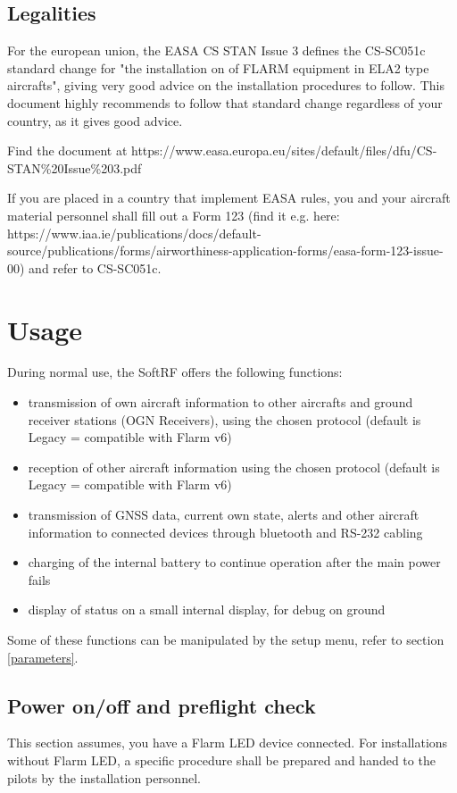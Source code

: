 \documentclass[10pt,a4paper]{article}
\begin{document}
\subsection{Legalities}
For the european union, the EASA CS STAN Issue 3 defines the CS-SC051c standard change for "the installation on of FLARM equipment in ELA2 type aircrafts", giving very good advice on the installation procedures to follow. This document highly recommends to follow that standard change regardless of your country, as it gives good advice.

Find the document at https://www.easa.europa.eu/sites/default/files/dfu/CS-STAN\%20Issue\%203.pdf

If you are placed in a country that implement EASA rules, you and your aircraft material personnel shall fill out a Form 123 (find it e.g. here: https://www.iaa.ie/publications/docs/default-source/publications/forms/airworthiness-application-forms/easa-form-123-issue-00) and refer to CS-SC051c.

\section{Usage}
During normal use, the SoftRF offers the following functions:

\begin{itemize}
\item transmission of own aircraft information to other aircrafts and ground receiver stations (OGN Receivers), using the chosen protocol (default is Legacy = compatible with Flarm v6)
\item reception of other aircraft information using the chosen protocol (default is Legacy = compatible with Flarm v6)
\item transmission of GNSS data, current own state, alerts and other aircraft information to connected devices through bluetooth and RS-232 cabling
\item charging of the internal battery to continue operation after the main power fails
\item display of status on a small internal display, for debug on ground
\end{itemize}

Some of these functions can be manipulated by the setup menu, refer to section \ref{parameters}.

\subsection{Power on/off and preflight check}\label{usage_power}
This section assumes, you have a Flarm LED device connected. For installations without Flarm LED, a specific procedure shall be prepared and handed to the pilots by the installation personnel.\\
\end{document}
